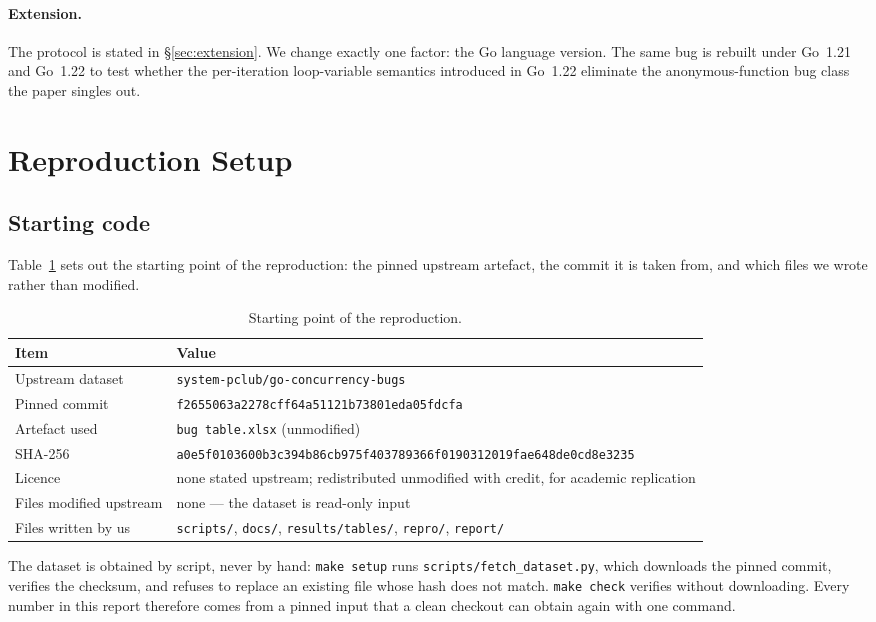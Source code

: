 \documentclass[11pt]{article}
\begin{document}
\paragraph{Extension.} The protocol is stated in \S\ref{sec:extension}. We change exactly one factor: the Go language
version. The same bug is rebuilt under Go~1.21 and Go~1.22 to test whether
the per-iteration loop-variable semantics introduced in Go~1.22 eliminate the
anonymous-function bug class the paper singles out.

\section{Reproduction Setup}
\label{sec:setup}

\subsection{Starting code}

Table~\ref{tab:starting} sets out the starting point of the
reproduction: the pinned upstream artefact, the commit it is taken from, and
which files we wrote rather than modified.


\begin{table}[h]
\centering
\caption{Starting point of the reproduction.}
\label{tab:starting}
\begin{tabular}{@{}p{}p{}@{}}
\toprule
Item & Value \\
\midrule
Upstream dataset & \texttt{system-pclub/go-concurrency-bugs} \\
Pinned commit & \texttt{f2655063a2278cff64a51121b73801eda05fdcfa} \\
Artefact used & \texttt{bug table.xlsx} (unmodified) \\
SHA-256 & \nolinkurl{a0e5f0103600b3c394b86cb975f403789366f0190312019fae648de0cd8e3235} \\
Licence & none stated upstream; redistributed unmodified with credit, for academic replication \\
Files modified upstream & none --- the dataset is read-only input \\
Files written by us & \texttt{scripts/}, \texttt{docs/}, \texttt{results/tables/}, \texttt{repro/}, \texttt{report/} \\
\bottomrule
\end{tabular}
\end{table}

The dataset is obtained by script, never by hand: \texttt{make setup} runs
\texttt{scripts/fetch\_dataset.py}, which downloads the pinned commit, verifies
the checksum, and refuses to replace an existing file whose hash does not
match. \texttt{make check} verifies without downloading. Every number in this
report therefore comes from a pinned input that a clean checkout can obtain
again with one command.
\end{document}
